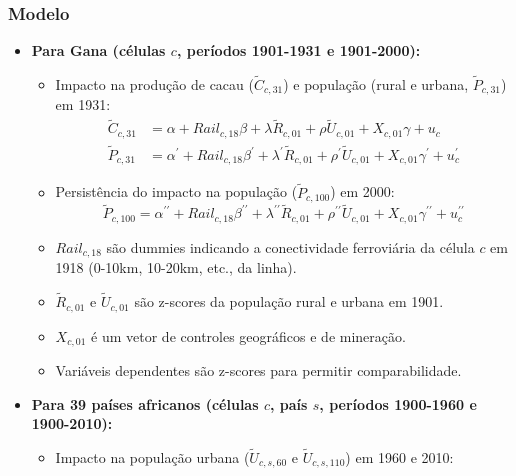 \documentclass[12pt]{article}
\begin{document}
\subsubsection*{Modelo}
\begin{itemize}
    \item \textbf{Para Gana (células $c$, períodos 1901-1931 e 1901-2000):}
    \begin{itemize}
        \item Impacto na produção de cacau ($\tilde{C}_{c,31}$) e população (rural e urbana, $\tilde{P}_{c,31}$) em 1931:
        \begin{align}
            \tilde{C}_{c,31} &= \alpha + Rail_{c,18}\beta + \lambda\tilde{R}_{c,01} + \rho\tilde{U}_{c,01} + X_{c,01}\gamma + u_{c} \label{eq:ghana_cocoa} \\
            \tilde{P}_{c,31} &= \alpha^{\prime} + Rail_{c,18}\beta^{\prime} + \lambda^{\prime}\tilde{R}_{c,01} + \rho^{\prime}\tilde{U}_{c,01} + X_{c,01}\gamma^{\prime} + u_{c}^{\prime} \label{eq:ghana_pop31}
        \end{align}
        \item Persistência do impacto na população ($\tilde{P}_{c,100}$) em 2000:
        \begin{equation} \label{eq:ghana_pop100}
            \tilde{P}_{c,100} = \alpha^{\prime\prime} + Rail_{c,18}\beta^{\prime\prime} + \lambda^{\prime\prime}\tilde{R}_{c,01} + \rho^{\prime\prime}\tilde{U}_{c,01} + X_{c,01}\gamma^{\prime\prime} + u_{c}^{\prime\prime}
        \end{equation}
        \item $Rail_{c,18}$ são dummies indicando a conectividade ferroviária da célula $c$ em 1918 (0-10km, 10-20km, etc., da linha).
        \item $\tilde{R}_{c,01}$ e $\tilde{U}_{c,01}$ são z-scores da população rural e urbana em 1901.
        \item $X_{c,01}$ é um vetor de controles geográficos e de mineração.
        \item Variáveis dependentes são z-scores para permitir comparabilidade.
    \end{itemize}
    \item \textbf{Para 39 países africanos (células $c$, país $s$, períodos 1900-1960 e 1900-2010):}
    \begin{itemize}
        \item Impacto na população urbana ($\tilde{U}_{c,s,60}$ e $\tilde{U}_{c,s,110}$) em 1960 e 2010:
        \begin{align}

\end{align}
\end{itemize}
\end{itemize}
\end{document}
